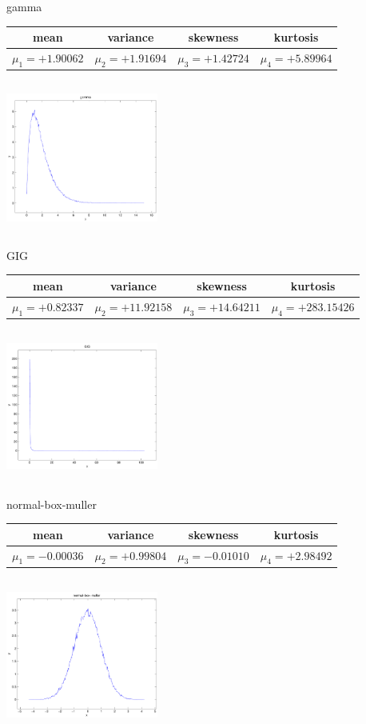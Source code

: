 \documentclass[9pt]{article}
\theoremstyle{plain}
\theoremstyle{definition}
\theoremstyle{remark}
\numberwithin{equation}{section}
\begin{document}
\newpage
gamma \begin{tabular}{|c|c|c|c|}  mean & variance & skewness & kurtosis \\  \hline
$\mu_1 = +1.90062$ & $\mu_2 = +1.91694$ & $\mu_3 = +1.42724$ & $\mu_4 =+5.89964$ \\
\end{tabular}

\includegraphics[width=5cm,height=5cm]{gamma.pdf}

GIG \begin{tabular}{|c|c|c|c|}  mean & variance & skewness & kurtosis \\  \hline
$\mu_1 = +0.82337$ & $\mu_2 = +11.92158$ & $\mu_3 = +14.64211$ & $\mu_4 =+283.15426$ \\
\end{tabular}

\includegraphics[width=5cm,height=5cm]{GIG.pdf}

normal-box-muller \begin{tabular}{|c|c|c|c|}  mean & variance & skewness & kurtosis \\  \hline
$\mu_1 = -0.00036$ & $\mu_2 = +0.99804$ & $\mu_3 = -0.01010$ & $\mu_4 =+2.98492$ \\
\end{tabular}

\includegraphics[width=5cm,height=5cm]{normal-box-muller.pdf}
\end{document}
